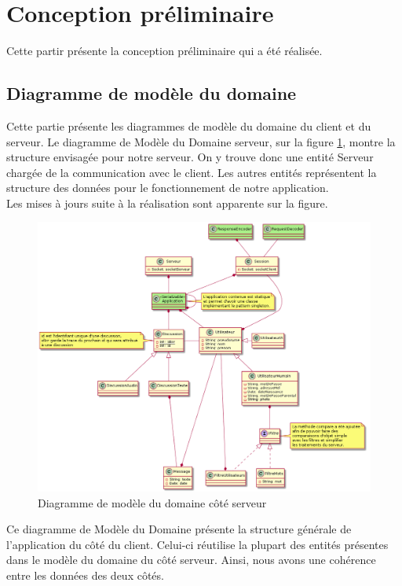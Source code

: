 \section{Conception préliminaire}

Cette partir présente la conception préliminaire qui a été réalisée.

	\subsection{Diagramme de modèle du domaine}
	Cette partie présente les diagrammes de modèle du domaine du client et du serveur.
	Le diagramme de Modèle du Domaine serveur, sur la figure \ref{diagModeleServeur}, montre la structure envisagée pour notre serveur.
	On y trouve donc une entité Serveur chargée de la communication avec le client.
	Les autres entités représentent la structure des données pour le fonctionnement de notre application.\\
	
	Les mises à jours suite à la réalisation sont apparente sur la figure.

	\begin{figure}[H]
	\centerline{\includegraphics[width=16.5cm]{img/modeleDomaineServeurV2.png}}
	\caption{\label{diagModeleServeur}Diagramme de modèle du domaine côté serveur}
	\end{figure}

	\newpage

	Ce diagramme de Modèle du Domaine présente la structure générale de l'application du côté du client.
	Celui-ci réutilise la plupart des entités présentes dans le modèle du domaine du côté serveur.
	Ainsi, nous avons une cohérence entre les données des deux côtés. \\
	
